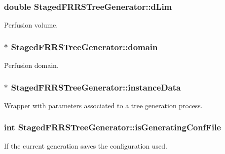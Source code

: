 \subsubsection[{\texorpdfstring{d\+Lim}{dLim}}]{\setlength{\rightskip}{0pt plus 5cm}double Staged\+F\+R\+R\+S\+Tree\+Generator\+::d\+Lim\hspace{0.3cm}{\ttfamily [private]}}\hypertarget{class_staged_f_r_r_s_tree_generator_add278e195be9de240c8460e6480f0a44}{}\label{class_staged_f_r_r_s_tree_generator_add278e195be9de240c8460e6480f0a44}
Perfusion volume. 
\subsubsection[{\texorpdfstring{domain}{domain}}]{$\ast$ Staged\+F\+R\+R\+S\+Tree\+Generator\+::domain\hspace{0.3cm}{\ttfamily [private]}}\hypertarget{class_staged_f_r_r_s_tree_generator_adc8ddbcf948810b70a7f9b59237a36e2}{}\label{class_staged_f_r_r_s_tree_generator_adc8ddbcf948810b70a7f9b59237a36e2}
Perfusion domain. 
\subsubsection[{\texorpdfstring{instance\+Data}{instanceData}}]{$\ast$ Staged\+F\+R\+R\+S\+Tree\+Generator\+::instance\+Data\hspace{0.3cm}{\ttfamily [private]}}\hypertarget{class_staged_f_r_r_s_tree_generator_a8df19e56e9037a0f012cbaa6beb171ca}{}\label{class_staged_f_r_r_s_tree_generator_a8df19e56e9037a0f012cbaa6beb171ca}
Wrapper with parameters associated to a tree generation process. 
\subsubsection[{\texorpdfstring{is\+Generating\+Conf\+File}{isGeneratingConfFile}}]{\setlength{\rightskip}{0pt plus 5cm}int Staged\+F\+R\+R\+S\+Tree\+Generator\+::is\+Generating\+Conf\+File\hspace{0.3cm}{\ttfamily [private]}}\hypertarget{class_staged_f_r_r_s_tree_generator_ae6ab29d9d31103363d0f46e163f9e0cd}{}\label{class_staged_f_r_r_s_tree_generator_ae6ab29d9d31103363d0f46e163f9e0cd}
If the current generation saves the configuration used. 
